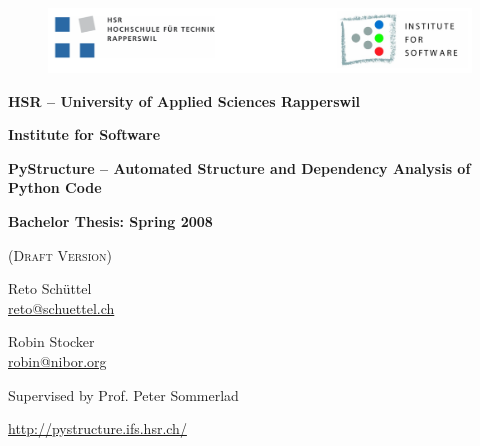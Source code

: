 \documentclass[12pt,halfparskip,DIV11,BCOR10mm]{scrreprt}
\begin{document}
\begin{titlepage}

\thispagestyle{empty}

\begin{center}

\begin{figure}[h]
 \centering
 \vspace{0,5cm}
 \includegraphics[width=\textwidth]{img/hsr_logo}
\end{figure}

\vspace{1cm}
{\Large \bfseries HSR -- University of Applied Sciences Rapperswil}

\vspace{0,5cm}
{\Large \bfseries Institute for Software}

\vspace{2cm}
{\Huge \bfseries PyStructure -- Automated Structure and Dependency Analysis of Python Code}

\vspace{1,5cm}

{\Large \bfseries Bachelor Thesis: Spring 2008}

\vspace{0,5cm}

\SVNDate{} (\textsc{Draft Version}) %


\vspace{1cm}
Reto Schüttel \\ \url{reto@schuettel.ch}

\vspace{0,5cm}
Robin Stocker \\ \url{robin@nibor.org}

\vspace{0,5cm}
Supervised by Prof. Peter Sommerlad %


\vspace{1cm}
\url{http://pystructure.ifs.hsr.ch/}

\end{center}
\end{titlepage}


\pagestyle{plain}

\end{document}
